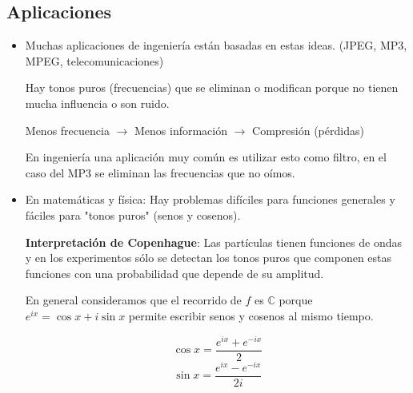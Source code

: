 \subsection{Aplicaciones}
\begin{itemize}
	\item Muchas aplicaciones de ingeniería están basadas en estas ideas. (JPEG, MP3, MPEG, telecomunicaciones)

	Hay tonos puros (frecuencias) que se eliminan o modifican porque no tienen mucha influencia o son ruido.

	Menos frecuencia $\rightarrow$ Menos información $\rightarrow$ Compresión (pérdidas)

	En ingeniería una aplicación muy común es utilizar esto como filtro, en el caso del MP3 se eliminan las frecuencias que no oímos.

	\item En matemáticas y física: Hay problemas difíciles para funciones generales y fáciles para "tonos puros" (senos y cosenos).

		\textbf{Interpretación de Copenhague}: Las partículas tienen funciones de ondas y en los experimentos sólo se detectan los tonos puros que componen estas funciones con una probabilidad que depende de su amplitud.




%
%





	\obs En general consideramos que el recorrido de $f$ es $\mathbb{C}$ porque $e^{ix} = \cos x + i\sin x$ permite escribir senos y cosenos al mismo tiempo.

	$$\cos x = \frac{e^{ix} + e^{-ix}}{2}$$
	$$\sin x = \frac{e^{ix} - e^{-ix}}{2i}$$

\end{itemize}

